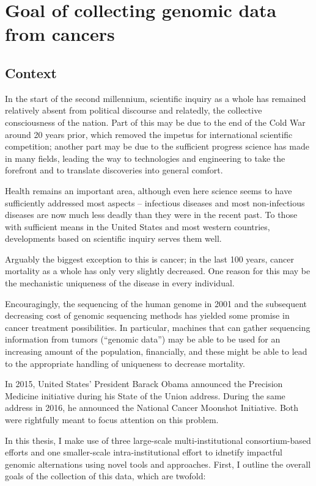 \chapter{Goal of collecting genomic data from cancers}

\section{Context}
In the start of the second millennium, scientific inquiry as a whole
has remained relatively absent from political discourse and relatedly,
the collective consciousness of the nation. Part of this may be due to
the end of the Cold War around 20 years prior, which removed the
impetus for international scientific competition; another part may be
due to the sufficient progress science has made in many fields,
leading the way to technologies and engineering to take the forefront
and to translate discoveries into general comfort.

Health remains an important area, although even here science seems to
have sufficiently addressed most aspects – infectious diseases and
most non-infectious diseases are now much less deadly than they were
in the recent past. To those with sufficient means in the United
States and most western countries, developments based on scientific
inquiry serves them well.

Arguably the biggest exception to this is cancer; in the last 100
years, cancer mortality as a whole has only very slightly
decreased. One reason for this may be the mechanistic uniqueness of
the disease in every individual.

Encouragingly, the sequencing of the human genome in 2001 and the
subsequent decreasing cost of genomic sequencing methods has yielded
some promise in cancer treatment possibilities. In particular,
machines that can gather sequencing information from tumors (“genomic
data”) may be able to be used for an increasing amount of the
population, financially, and these might be able to lead to the
appropriate handling of uniqueness to decrease mortality.

In 2015, United States’ President Barack Obama announced the Precision
Medicine initiative during his State of the Union address. During the
same address in 2016, he announced the National Cancer Moonshot
Initiative. Both were rightfully meant to focus attention on this
problem.

        In this thesis, I make use of
        three large-scale multi-institutional consortium-based efforts and one
        smaller-scale intra-institutional effort to idnetify impactful genomic
        alternations using novel tools and approaches. First, I
        outline the overall goals of the collection of this data,
        which are twofold: 


